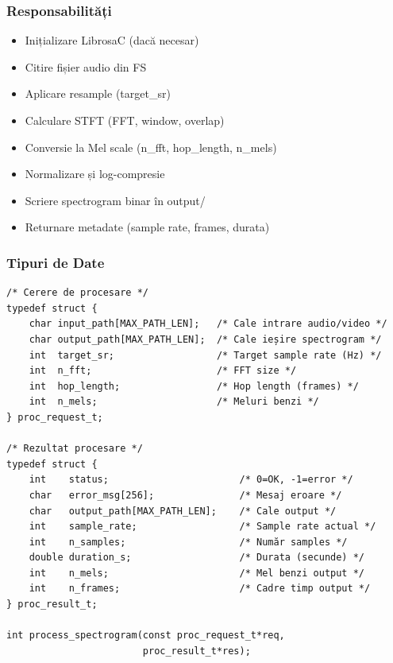 \documentclass[12pt,a4paper,twoside]{article}
\begin{document}
\subsubsection{Responsabilități}

\begin{itemize}
    \item Inițializare LibrosaC (dacă necesar)
    \item Citire fișier audio din FS
    \item Aplicare resample (target\_sr)
    \item Calculare STFT (FFT, window, overlap)
    \item Conversie la Mel scale (n\_fft, hop\_length, n\_mels)
    \item Normalizare și log-compresie
    \item Scriere spectrogram binar în output/
    \item Returnare metadate (sample rate, frames, durata)
\end{itemize}

\subsubsection{Tipuri de Date}

\begin{lstlisting}
/* Cerere de procesare */
typedef struct {
    char input_path[MAX_PATH_LEN];   /* Cale intrare audio/video */
    char output_path[MAX_PATH_LEN];  /* Cale ieșire spectrogram */
    int  target_sr;                  /* Target sample rate (Hz) */
    int  n_fft;                      /* FFT size */
    int  hop_length;                 /* Hop length (frames) */
    int  n_mels;                     /* Meluri benzi */
} proc_request_t;

/* Rezultat procesare */
typedef struct {
    int    status;                       /* 0=OK, -1=error */
    char   error_msg[256];               /* Mesaj eroare */
    char   output_path[MAX_PATH_LEN];    /* Cale output */
    int    sample_rate;                  /* Sample rate actual */
    int    n_samples;                    /* Număr samples */
    double duration_s;                   /* Durata (secunde) */
    int    n_mels;                       /* Mel benzi output */
    int    n_frames;                     /* Cadre timp output */
} proc_result_t;

int process_spectrogram(const proc_request_t*req, 
                        proc_result_t*res);
\end{lstlisting}
\end{document}
